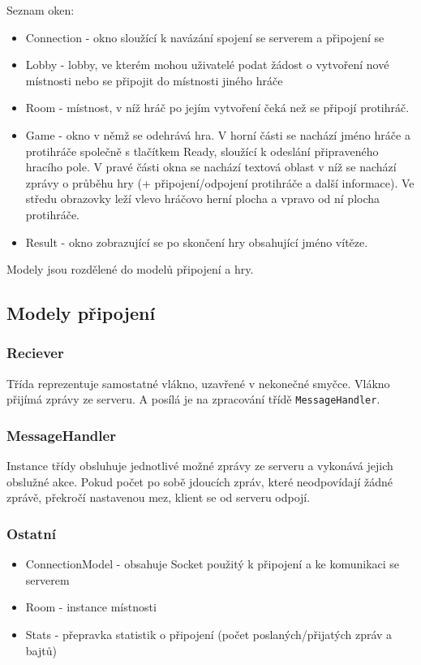 \documentclass[12pt, a4paper]{article} %
\begin{document}
	\par Seznam oken:
	\begin{itemize}
		\item Connection - okno sloužící k navázání spojení se serverem a připojení se
		\item Lobby - lobby, ve kterém mohou uživatelé podat žádost o vytvoření nové místnosti nebo se připojit do místnosti jiného hráče
		\item Room - místnost, v níž hráč po jejím vytvoření čeká než se připojí protihráč.
		\item Game - okno v němž se odehrává hra. V horní části se nachází jméno hráče a protihráče společně s tlačítkem Ready, sloužící k odeslání připraveného hracího pole. V pravé části okna se nachází textová oblast v níž se nachází zprávy o průběhu hry (+ připojení/odpojení protihráče a další informace). Ve středu obrazovky leží vlevo hráčovo herní plocha a vpravo od ní plocha protihráče.
		\item Result - okno zobrazující se po skončení hry obsahující jméno vítěze.
	\end{itemize}
	Modely jsou rozdělené do modelů připojení a hry.

	\subsection{Modely připojení}	
	\subsubsection{Reciever}
	\par Třída reprezentuje samostatné vlákno, uzavřené v nekonečné smyčce. Vlákno přijímá zprávy ze serveru. A posílá je na zpracování třídě \texttt{MessageHandler}.
	
	\subsubsection{MessageHandler}
	\par Instance třídy obsluhuje jednotlivé možné zprávy ze serveru a vykonává jejich obslužné akce. Pokud počet po sobě jdoucích zpráv, které neodpovídají žádné zprávě, překročí nastavenou mez, klient se od serveru odpojí.
	
	\subsubsection{Ostatní}
	\begin{itemize}
		\item ConnectionModel - obsahuje Socket použitý k připojení a ke komunikaci se serverem
		\item Room - instance místnosti
		\item Stats - přepravka statistik o připojení (počet poslaných/přijatých zpráv a bajtů)
	\end{itemize}
	
\end{document}
